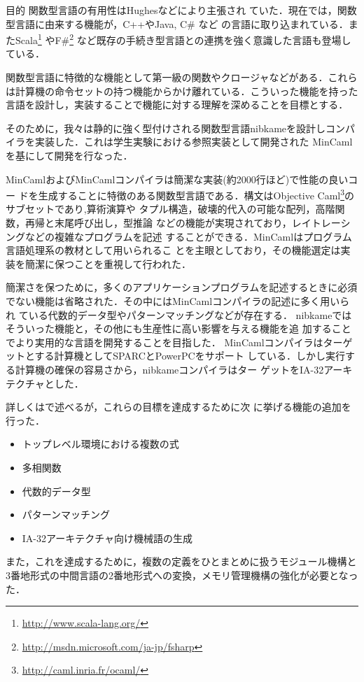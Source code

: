 \documentclass[a4paper,titlepage,report]{jsbook}
\begin{document}
\begin{resbonsiblesection}{目的}{\kobori}
関数型言語の有用性はHughes\cite{hughes1989functional}などにより主張され
ていた．現在では，関数型言語に由来する機能が，C++やJava, C\# など
の言語に取り込まれている．またScala\footnote{\url{http://www.scala-lang.org/}}
やF\#{}\footnote{\url{http://msdn.microsoft.com/ja-jp/fsharp}}
など既存の手続き型言語との連携を強く意識した言語も登場している．

関数型言語に特徴的な機能として第一級の関数やクロージャなどがある．これら
は計算機の命令セットの持つ機能からかけ離れている．こういった機能を持った
言語を設計し，実装することで機能に対する理解を深めることを目標とする．

そのために，我々は静的に強く型付けされる関数型言語nibkameを設計しコンパ
イラを実装した．これは学生実験における参照実装として開発された
MinCaml\cite{住井英二郎:2008-04-24}を基にして開発を行なった．

MinCamlおよびMinCamlコンパイラは簡潔な実装(約2000行ほど)で性能の良いコー
ドを生成することに特徴のある関数型言語である．構文はObjective
Caml\footnote{\url{http://caml.inria.fr/ocaml/}}のサブセットであり,算術演算や
タプル構造，破壊的代入の可能な配列，高階関数，再帰と末尾呼び出し，型推論
などの機能が実現されており，レイトレーシングなどの複雑なプログラムを記述
することができる．MinCamlはプログラム言語処理系の教材として用いられるこ
とを主眼としており，その機能選定は実装を簡潔に保つことを重視して行われた．

簡潔さを保つために，多くのアプリケーションプログラムを記述するときに必須
でない機能は省略された．その中にはMinCamlコンパイラの記述に多く用いられ
ている代数的データ型やパターンマッチングなどが存在する．
nibkameではそういった機能と，その他にも生産性に高い影響を与える機能を追
加することでより実用的な言語を開発することを目指した．
MinCamlコンパイラはターゲットとする計算機としてSPARCとPowerPCをサポート
している．しかし実行する計算機の確保の容易さから，nibkameコンパイラはター
ゲットをIA-32アーキテクチャとした．

詳しくはで述べるが，これらの目標を達成するために次
に挙げる機能の追加を行った．
\begin{itemize}
 \item トップレベル環境における複数の式
 \item 多相関数
 \item 代数的データ型
 \item パターンマッチング
 \item IA-32アーキテクチャ向け機械語の生成
\end{itemize}
また，これを達成するために，複数の定義をひとまとめに扱うモジュール機構と
3番地形式の中間言語の2番地形式への変換，メモリ管理機構の強化が必要となっ
た．
\end{resbonsiblesection}
\end{document}
